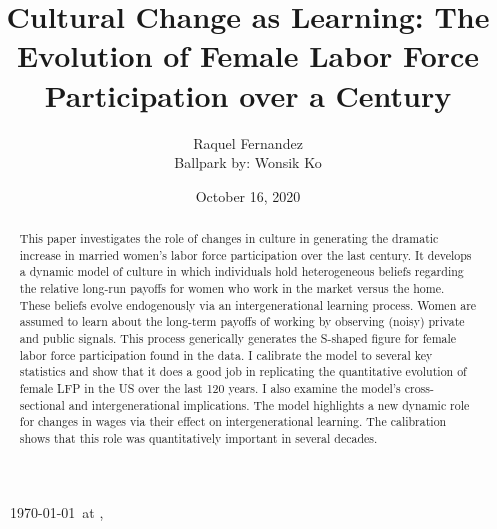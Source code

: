 \documentclass[titlepage]{\econtex}
\begin{document}
\providecommand{\versn}{}
\ifthenelse{\boolean{ifWeb}}{  \renewcommand{\ushort}{\underline}\renewcommand{\versn}{Web} }{} 

\hfill{\tiny \jobname~\versn~\today~{at} \DTMcurrenttime, ~~}

\title{Cultural Change as Learning: The Evolution of Female Labor Force Participation over a Century}

\author{Raquel Fernandez \\ Ballpark by: Wonsik Ko\authNum}



\renewcommand{\forcedate}{October 16, 2020}
\date{\forcedate}

\maketitle 
\hypertarget{abstract}{}
\begin{abstract}
 This paper investigates the role of changes in culture in generating the dramatic increase in married women's labor force participation over the last century. It develops a dynamic model of culture in which individuals hold heterogeneous beliefs regarding the relative long-run payoffs for women who work in the market versus the home. These beliefs evolve endogenously via an intergenerational learning process. Women are assumed to learn about the long-term payoffs of working by observing (noisy) private and public signals. This process generically generates the S-shaped figure for female labor force participation found in the data. I calibrate the model to several key statistics and show that it does a good job in replicating the quantitative evolution of female LFP in the US over the last 120 years. I also examine the model's cross-sectional and intergenerational implications. The model highlights a new dynamic role for changes in wages via their effect on intergenerational learning. The calibration shows that this role was quantitatively important in several decades.
\end{abstract}

\begin{authorsinfo}
\end{authorsinfo}
\end{document}
